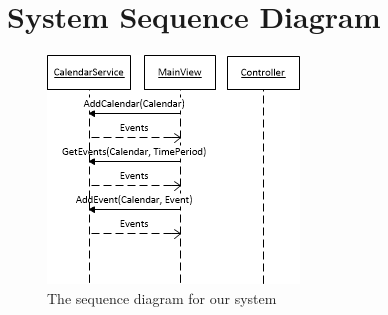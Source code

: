 \section{System Sequence Diagram}
\begin{figure}[h!]
  \includegraphics[width=\textwidth,natwidth=253,natheight=229]{illustrations/SSD.png}
  \caption{The sequence diagram for our system}
\end{figure}
\newpage
